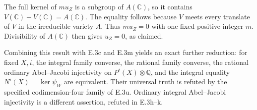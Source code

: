 The full kernel of $m u_Z$ is a subgroup of $A(\mathbb C)$,
so it contains $V(\mathbb C)-V(\mathbb C)=A(\mathbb C)$.
The equality follows because $V$ meets every translate of
$V$ in the irreducible variety $A$. Thus $m u_Z=0$ with one
fixed positive integer $m$. Divisibility of $A(\mathbb C)$
then gives $u_Z=0$, as claimed.

Combining this result with E.3c and E.3m yields an exact
further reduction: for fixed $X,i$, the integral family
converse, the rational family converse, the rational
ordinary Abel--Jacobi injectivity on $P^i(X)\otimes\mathbb Q$,
and the integral equality $N^i(X)=\ker\psi_W$ are equivalent.
Their universal truth is refuted by the specified
codimension-four family of E.3u. Ordinary integral Abel--Jacobi
injectivity is a different assertion, refuted in E.3h--k.
